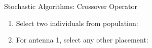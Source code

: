 \documentclass{beamer}
\begin{document}
\begin{frame}[t]{Stochastic Algorithms: Crossover Operator}
    \begin{enumerate}
        \item Select two individuals from population:\par
            \begin{minipage}[t]{\linewidth}
                \centering
            \end{minipage}
        \item For antenna 1, select any other placement:\par
            \begin{minipage}[t]{\linewidth}
                \centering
            \end{minipage}

\end{enumerate}
\end{frame}
\end{document}
